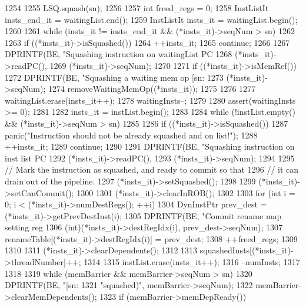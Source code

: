 \begin{DoxyCode}
1254 {
1255     LSQ.squash(sn);
1256 
1257     int freed_regs = 0;
1258     InstListIt insts_end_it = waitingList.end();
1259     InstListIt insts_it = waitingList.begin();
1260 
1261     while (insts_it != insts_end_it && (*insts_it)->seqNum > sn)
1262     {
1263         if ((*insts_it)->isSquashed()) {
1264             ++insts_it;
1265             continue;
1266         }
1267         DPRINTF(BE, "Squashing instruction on waitingList PC %
1268                 (*insts_it)->readPC(),
1269                 (*insts_it)->seqNum);
1270 
1271         if ((*insts_it)->isMemRef()) {
1272             DPRINTF(BE, "Squashing a waiting mem op [sn:%
1273                     (*insts_it)->seqNum);
1274             removeWaitingMemOp((*insts_it));
1275         }
1276 
1277         waitingList.erase(insts_it++);
1278         waitingInsts--;
1279     }
1280     assert(waitingInsts >= 0);
1281 
1282     insts_it = instList.begin();
1283 
1284     while (!instList.empty() && (*insts_it)->seqNum > sn)
1285     {
1286         if ((*insts_it)->isSquashed()) {
1287             panic("Instruction should not be already squashed and on list!");
1288             ++insts_it;
1289             continue;
1290         }
1291         DPRINTF(BE, "Squashing instruction on inst list PC %
1292                 (*insts_it)->readPC(),
1293                 (*insts_it)->seqNum);
1294 
1295         // Mark the instruction as squashed, and ready to commit so that
1296         // it can drain out of the pipeline.
1297         (*insts_it)->setSquashed();
1298 
1299         (*insts_it)->setCanCommit();
1300 
1301         (*insts_it)->clearInROB();
1302 
1303         for (int i = 0; i < (*insts_it)->numDestRegs(); ++i) {
1304             DynInstPtr prev_dest = (*insts_it)->getPrevDestInst(i);
1305             DPRINTF(BE, "Commit rename map setting reg %
1306                     (int)(*insts_it)->destRegIdx(i), prev_dest->seqNum);
1307             renameTable[(*insts_it)->destRegIdx(i)] = prev_dest;
1308             ++freed_regs;
1309         }
1310 
1311         (*insts_it)->clearDependents();
1312 
1313         squashedInsts[(*insts_it)->threadNumber]++;
1314 
1315         instList.erase(insts_it++);
1316         --numInsts;
1317     }
1318 
1319     while (memBarrier && memBarrier->seqNum > sn) {
1320         DPRINTF(BE, "[sn:%
1321                 "squashed)\n", memBarrier->seqNum);
1322         memBarrier->clearMemDependents();
1323         if (memBarrier->memDepReady()) {
}}}
\end{DoxyCode}
